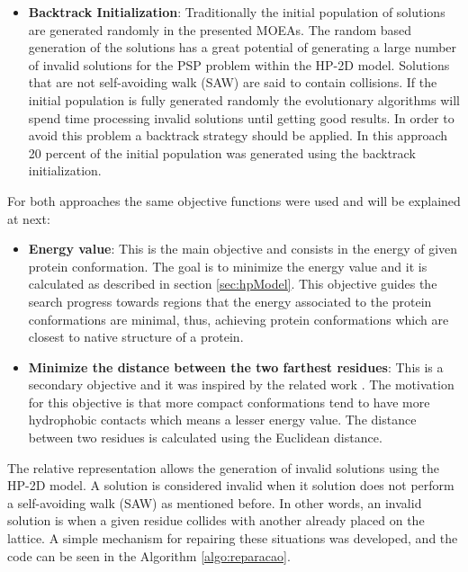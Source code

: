 \begin{itemize}
\begin{itemize}
		
		
	\end{itemize}

	
	\item \textbf{Backtrack Initialization}: Traditionally the initial population of solutions are generated randomly in the presented MOEAs. The random based generation of the solutions has a great potential of generating a large number of invalid solutions for the PSP problem within the HP-2D model. Solutions that are not self-avoiding walk (SAW) are said to contain collisions. If the initial population is fully generated randomly the evolutionary algorithms will spend time processing invalid solutions until getting good results. In order to avoid this problem a backtrack strategy should be applied. In this approach 20 percent of the initial population was generated using the backtrack initialization.
	
\end{itemize}


For both approaches the same objective functions were used and will be explained  at next:


\begin{itemize}
	\item \textbf{Energy value}: This is the main objective and consists in the energy of given protein conformation.  The goal is to minimize the energy value and it is calculated as described in section \ref{sec:hpModel}. This objective guides the search progress towards regions that the energy associated to the protein conformations are minimal, thus, achieving protein conformations which are closest to native structure of a protein.
	\item \textbf{Minimize the distance between the two farthest residues}: This is a secondary objective and it was inspired by the related work \cite{gabriel2012algoritmos}. The motivation for this objective is that more compact conformations tend to have more hydrophobic contacts which means a lesser energy value. The distance between two residues is calculated using the Euclidean distance.
\end{itemize}


The relative representation allows the generation of invalid solutions using the HP-2D model. A solution is considered invalid when it solution does not perform a self-avoiding walk (SAW) as mentioned before. In other words, an invalid solution is when a given residue collides with another already placed on the lattice. A simple mechanism for repairing these situations was developed, and the code can be seen in the Algorithm \ref{algo:reparacao}.


